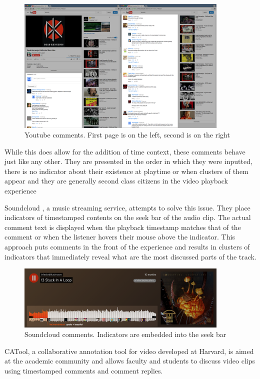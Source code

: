    \begin{figure}[thpb]
      \centering
      \includegraphics[width=4in]{figures/youtube-left.png}
      \caption{Youtube comments. First page is on the left, second is on the right}
      \label{fig_youtube_comments}
   \end{figure}

While this does allow for the addition of time context, these comments behave just like any other. They are presented in the order in which they were inputted, there is no indicator about their existence at playtime or when clusters of them appear and they are generally second class citizens in the video playback experience

Soundcloud \cite{soundcloud}, a music streaming service, attempts to solve this issue. They place indicators of timestamped contents on the seek bar of the audio clip. The actual comment text is displayed when the playback timestamp matches that of the comment or when the listener hovers their mouse above the indicator. This approach puts comments in the front of the experience and results in clusters of indicators that immediately reveal what are the most discussed parts of the track.

   \begin{figure}[thpb]
      \centering
      \includegraphics[width=4in]{figures/soundcloud.png}
      \caption{Soundcloud comments. Indicators are embedded into the seek bar}
      \label{fig_youtube_comments}
   \end{figure}

CATool\cite{catool}, a collaborative annotation tool for video developed at Harvard, is aimed at the academic community and allows faculty and students to discuss video clips using timestamped comments and comment replies.

